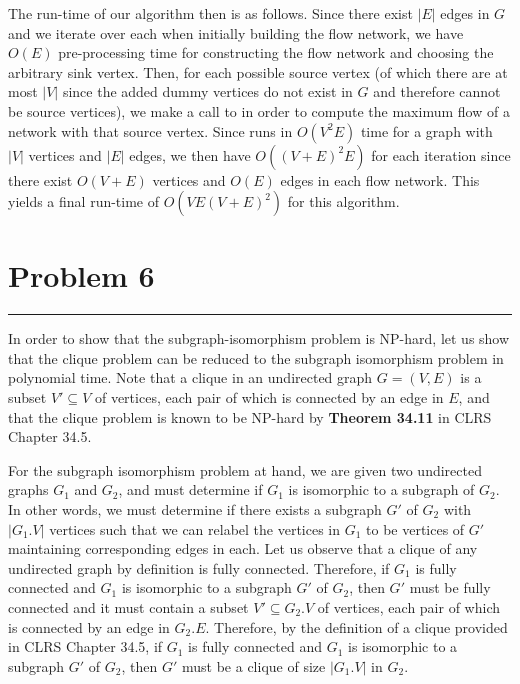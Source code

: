 \documentclass[11pt]{article}
\def\separateline{\medskip\hrule\medskip}
\begin{document}
The run-time of our algorithm then is as follows. Since there exist $|E|$ edges in $G$ and we iterate over each when initially building the flow network, we have $O(E)$ pre-processing time for constructing the flow network and choosing the arbitrary sink vertex. Then, for each possible source vertex (of which there are at most $|V|$ since the added dummy vertices do not exist in $G$ and therefore cannot be source vertices), we make a call to  in order to compute the maximum flow of a network with that source vertex. Since  runs in $O(V^2E)$ time for a graph with $|V|$ vertices and $|E|$ edges, we then have $O((V+E)^2E)$ for each iteration since there exist $O(V+E)$ vertices and $O(E)$ edges in each flow network. This yields a final run-time of $O(VE(V+E)^2)$ for this algorithm.

\newpage

\section{Problem 6}
\separateline

In order to show that the subgraph-isomorphism problem is NP-hard, let us show that the clique problem can be reduced to the subgraph isomorphism problem in polynomial time. Note that a clique in an undirected graph $G = (V,E)$ is a subset $V' \subseteq V$ of vertices, each pair of which is connected by an edge in $E$, and that the clique problem is known to be NP-hard by \textbf{Theorem 34.11} in CLRS Chapter 34.5.

For the subgraph isomorphism problem at hand, we are given two undirected graphs $G_1$ and $G_2$, and must determine if $G_1$ is isomorphic to a subgraph of $G_2$. In other words, we must determine if there exists a subgraph $G'$ of $G_2$ with $|G_1.V|$ vertices such that we can relabel the vertices in $G_1$ to be vertices of $G'$ maintaining corresponding edges in each. Let us observe that a clique of any undirected graph by definition is fully connected. Therefore, if $G_1$ is fully connected and $G_1$ is isomorphic to a subgraph $G'$ of $G_2$, then $G'$ must be fully connected and it must contain a subset $V' \subseteq G_2.V$ of vertices, each pair of which is connected by an edge in $G_2.E$. Therefore, by the definition of a clique provided in CLRS Chapter 34.5, if $G_1$ is fully connected and $G_1$ is isomorphic to a subgraph $G'$ of $G_2$, then $G'$ must be a clique of size $|G_1.V|$ in $G_2$.
\end{document}
